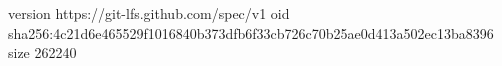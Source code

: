 version https://git-lfs.github.com/spec/v1
oid sha256:4c21d6e465529f1016840b373dfb6f33cb726c70b25ae0d413a502ec13ba8396
size 262240
